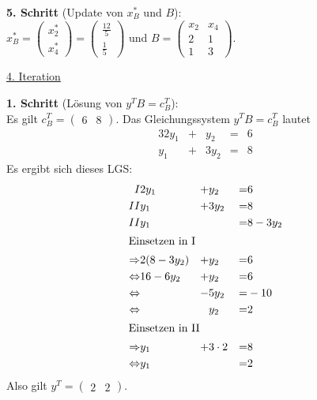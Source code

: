 \documentclass[10pt,a4paper,oneside,ngerman,numbers=noenddot]{scrartcl}
\begin{document}
		\textbf{5. Schritt} (Update von $x_{B}^{*}$ und $B$):\\
		$x_{B}^{*} = \begin{pmatrix} x_{2}^{*} \\ x_{4}^{*} \end{pmatrix} = \begin{pmatrix} \frac{12}{5} \\ \frac{1}{5} \end{pmatrix}$ und $B = \begin{pmatrix} x_{2} & x_{4} \\ 2 & 1 \\ 1 & 3 \end{pmatrix}$.
		
		\underline{4. Iteration}
		
		\textbf{1. Schritt} (Lösung von $y^{T}B = c_{B}^{T}$):\\
		Es gilt $c_{B}^{T} = \begin{pmatrix} 6 & 8 \end{pmatrix}$. Das Gleichungssystem $y^{T}B = c_{B}^{T}$ lautet
		\begin{alignat*}{3}
			2y_{1} &+& y_{2} &=& 6 \\
			y_{1} &+& 3y_{2} &=& 8
		\end{alignat*}
		Es ergibt sich dieses LGS:
		\begin{alignat*}{3}
			I & 2y_{1} &+& y_{2} &=& 6 \\
			II & y_{1} &+& 3y_{2} &=& 8 \\
			II & y_{1} && &=& 8 - 3y_{2} \\
			\intertext{Einsetzen in I}
			\Rightarrow & 2(8 - 3y_{2}) &+& y_{2} &=& 6 \\
			\Leftrightarrow & 16 - 6y_{2} &+& y_{2} &=& 6 \\
			\Leftrightarrow & &-& 5y_{2} &=& -10 \\
			\Leftrightarrow & && y_{2} &=& 2 \\
			\intertext{Einsetzen in II}
			\Rightarrow & y_{1} &+& 3 \cdot 2 &=& 8 \\
			\Leftrightarrow & y_{1} && &=& 2
		\end{alignat*}
		Also gilt $y^{T} = \begin{pmatrix} 2 & 2 \end{pmatrix}$.
		
\end{document}
